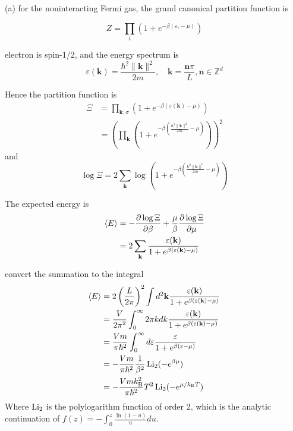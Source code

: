 \documentclass[a4paper,11pt]{article}
\begin{document}
(a) for the noninteracting Fermi gas, the grand canonical partition function is

\begin{equation}
    Z = \prod_{i}\left(1 + e^{-\beta(\varepsilon_i -\mu)}\right)
\end{equation}

electron is spin-1/2, and the energy spectrum is
\begin{equation}
    \varepsilon(\mathbf k)=\frac{\hbar^2\|\mathbf k\|^2}{2m}, \quad \mathbf k=\frac{\mathbf n\pi}{L}, \mathbf n\in\mathbb Z^d
\end{equation}

Hence the partition function is
\begin{align}
    \Xi 
    &= \prod_{\mathbf k, \sigma}\left(1 + e^{-\beta(\varepsilon(\mathbf k) -\mu)}\right) \\
    &= \left(\prod_{\mathbf k}\left(1+ e^{-\beta\left(\frac{\hbar^2\|\mathbf{k}\|^2}{2m} -\mu\right)}\right)\right)^2
\end{align}
and
\begin{equation}
    \log \Xi 
     = 2\sum_{\mathbf k} \log\left(1+ e^{-\beta\left(\frac{\hbar^2\|\mathbf{k}\|^2}{2m} -\mu\right)}\right)
\end{equation}


The expected energy is
\begin{align}
    \braket{E}&=-\frac{\partial\log\Xi}{\partial \beta}+\frac{\mu}{\beta}\frac{\partial\log\Xi}{\partial \mu} \\
    &=2\sum_{\mathbf{k}}\frac{\varepsilon(\mathbf k)}{1 + e^{\beta(\varepsilon(\mathbf k) - \mu)}}
\end{align}

convert the summation to the integral 
\begin{align}
    \braket{E}
    &=2\left(\frac{L}{2\pi}\right)^2\int d^2\mathbf k \frac{\varepsilon(\mathbf k)}{1 + e^{\beta(\varepsilon(\mathbf k) - \mu)}} \\
    &=\frac{V}{2\pi^2}\int_0^\infty 2\pi k dk \frac{\varepsilon(\mathbf k)}{1 + e^{\beta(\varepsilon(\mathbf k) - \mu)}}\\
    &=\frac{Vm}{\pi\hbar^2}\int_0^\infty d\varepsilon \frac{\varepsilon}{1 + e^{\beta(\varepsilon - \mu)}}\\
    &=-\frac{Vm}{\pi\hbar^2}\frac{1}{\beta^2}\operatorname{Li}_2(-e^{\beta\mu})\\
    &=-\frac{Vmk_{\mathrm{B}}^2}{\pi\hbar^2}T^2\operatorname{Li}_2(-e^{\mu/k_{\mathrm{B}} T})
\end{align}
Where $\operatorname{Li}_2$ is the polylogarithm function of order 2, which is the analytic continuation of $f(z)=-\int_{0}^{z}\frac{\ln(1-u)}{u}du$.
\end{document}
